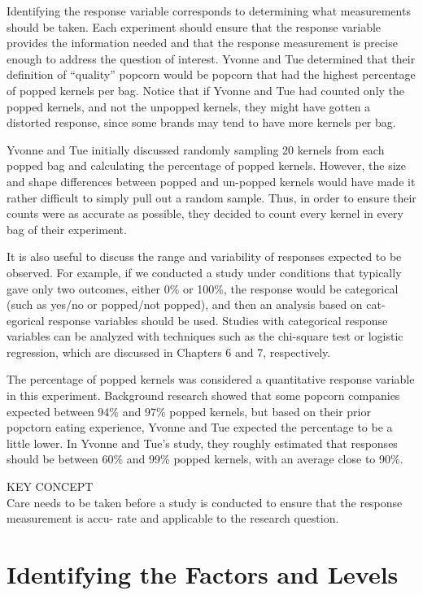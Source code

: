 \documentclass[
]{report}
\theoremstyle{definition}
\theoremstyle{definition}
\theoremstyle{definition}
\theoremstyle{definition}
\theoremstyle{remark}
\begin{document}
Identifying the response variable corresponds to determining what measurements should be taken. Each
experiment should ensure that the response variable provides the information needed and that the response
measurement is precise enough to address the question of interest. Yvonne and Tue determined that their
definition of ``quality'' popcorn would be popcorn that had the highest percentage of popped kernels per bag.
Notice that if Yvonne and Tue had counted only the popped kernels, and not the unpopped kernels, they might
have gotten a distorted response, since some brands may tend to have more kernels per bag.

Yvonne and Tue initially discussed randomly sampling 20 kernels from each popped bag and calculating the percentage of popped kernels. However, the size and shape differences between popped and
un-popped kernels would have made it rather difficult to simply pull out a random sample. Thus, in order
to ensure their counts were as accurate as possible, they decided to count every kernel in every bag of their
experiment.

It is also useful to discuss the range and variability of responses expected to be observed. For example,
if we conducted a study under conditions that typically gave only two outcomes, either 0\% or 100\%, the
response would be categorical (such as yes/no or popped/not popped), and then an analysis based on cat-
egorical response variables should be used. Studies with categorical response variables can be analyzed
with techniques such as the chi-square test or logistic regression, which are discussed in Chapters 6 and 7,
respectively.

The percentage of popped kernels was considered a quantitative response variable in this experiment.
Background research showed that some popcorn companies expected between 94\% and 97\% popped kernels,
but based on their prior popctorn eating experience, Yvonne and Tue expected the percentage to be a little
lower. In Yvonne and Tue's study, they roughly estimated that responses should be between 60\% and 99\%
popped kernels, with an average close to 90\%.

KEY CONCEPT\\
Care needs to be taken before a study is conducted to ensure that the response measurement is accu-
rate and applicable to the research question.

\hypertarget{identifying-the-factors-and-levels}{%
\section{Identifying the Factors and Levels}\label{identifying-the-factors-and-levels}}
\end{document}
